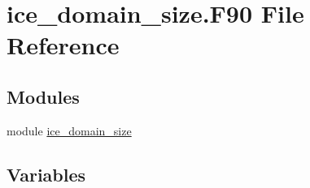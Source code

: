 \hypertarget{ice__domain__size_8F90}{
\section{ice\_\-domain\_\-size.F90 File Reference}
\label{ice__domain__size_8F90}
}
\subsection*{Modules}
\begin{DoxyCompactItemize}
\item 
module \hyperlink{namespaceice__domain__size}{ice\_\-domain\_\-size}
\end{DoxyCompactItemize}
\subsection*{Variables}
